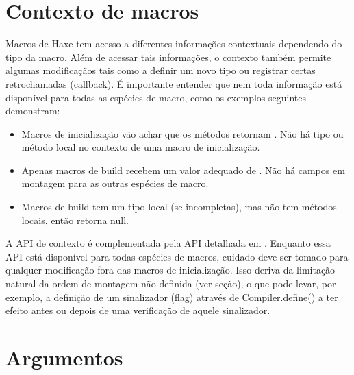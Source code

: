 \section{Contexto de macros}
\label{macro-context}


Macros de Haxe tem acesso a diferentes informações contextuais dependendo do tipo da macro. Além de acessar tais informações, o contexto também permite algumas modificaçãos tais como a definir um novo tipo ou registrar certas retrochamadas (callback). É importante entender que nem toda informação está disponível para todas as espécies de macro, como os exemplos seguintes demonstram:

\begin{itemize}
    \item Macros de inicialização vão achar que os métodos  retornam . Não há tipo ou método local no contexto de uma macro de inicialização.
    \item Apenas macros de build recebem um valor adequado de . Não há campos em montagem para as outras espécies de macro.
    \item Macros de build tem um tipo local (se incompletas), mas não tem métodos locais, então  retorna {null}.
\end{itemize}

A API de contexto é complementada pela API  detalhada em . Enquanto essa API está disponível para todas espécies de macros, cuidado deve ser tomado para qualquer modificação fora das macros de inicialização. Isso deriva da limitação natural da ordem de montagem não definida (ver seção), o que pode levar, por exemplo, a definição de um sinalizador (flag) através de Compiler.define() a ter efeito antes ou depois de uma verificação de  aquele sinalizador.

\section{Argumentos}
\label{macro-arguments}

